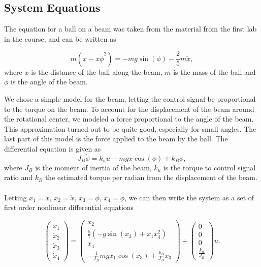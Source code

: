 \subsection{System Equations}


The equation for a ball on a beam was taken from the material from the first lab in the course, and can be written as

\begin{equation}
m(\ddot{x}-x\dot{\phi}^{2})=-mg\sin(\phi)-\frac{2}{5}m\ddot{x},
\end{equation}
where $x$ is the distance of the ball along the beam, $m$ is the mass of the ball and $\phi$ is the angle of the beam.

We chose a simple model for the beam, letting the control signal be proportional to the torque on the beam.
To account for the displacement of the beam around the rotational center, we modeled a force proportional to the angle of the beam.
This approximation turned out to be quite good, especially for small angles.
The last part of this model is the force applied to the beam by the ball.
The differential equation is given as
\begin{equation}
J_{B}\ddot{\phi}=k_{u}u-mgx\cos(\phi)+k_B\phi,
\end{equation}
where $J_{B}$ is the moment of inertia of the beam, $k_u$ is the torque to control signal ratio and $k_B$ the estimated torque per radian from the displacement of the beam.\\
\\
Letting $x_{1}=x,\, x_{2}=\dot{x},\, x_{3}=\phi,\, x_{4}=\dot{\phi}$,
we can then write the system as a set of first order nonlinear differential equations

%
%
%
%

\[
\begin{pmatrix}\dot{x}_{1}\\
\dot{x}_{2}\\
\dot{x}_{3}\\
\dot{x}_{4}
\end{pmatrix}=\begin{pmatrix}x_{2}\\
\frac{5}{7}\left(-g\sin(x_{3})+x_{1}x_{4}^{2}\right)\\
x_{4}\\
-\frac{1}{J_B}mgx_{1}\cos(x_3)+\frac{k_B}{J_B}x_3
\end{pmatrix}+\begin{pmatrix}0\\
0\\
0\\
\frac{k_{u}}{J_B}
\end{pmatrix}u.
\]

